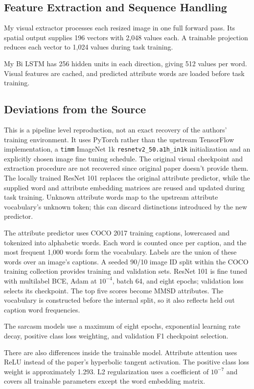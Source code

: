 \documentclass[conference]{IEEEtran}
\begin{document}
\subsection{Feature Extraction and Sequence Handling}
My visual extractor processes each resized image in one full forward pass. Its spatial output supplies 196 vectors with 2,048 values each. A trainable projection reduces each vector to 1,024 values during task training.

My Bi LSTM has 256 hidden units in each direction, giving 512 values per word. Visual features are cached, and predicted attribute words are loaded before task training.

\subsection{Deviations from the Source}
This is a pipeline level reproduction, not an exact recovery of the authors' training environment. It uses PyTorch rather than the upstream TensorFlow implementation, a \texttt{timm} ImageNet 1k \texttt{resnetv2\_50.a1h\_in1k} initialization and an explicitly chosen image fine tuning schedule. The original visual checkpoint and extraction procedure are not recovered since original paper doesn't provide them. The locally trained ResNet 101 replaces the original attribute predictor, while the supplied word and attribute embedding matrices are reused and updated during task training. Unknown attribute words map to the upstream attribute vocabulary's unknown token; this can discard distinctions introduced by the new predictor.

The attribute predictor uses COCO 2017 training captions, lowercased and tokenized into alphabetic words. Each word is counted once per caption, and the most frequent 1,000 words form the vocabulary. Labels are the union of these words over an image's captions. A seeded 90/10 image ID split within the COCO training collection provides training and validation sets. ResNet 101 is fine tuned with multilabel BCE, Adam at $10^{-4}$, batch 64, and eight epochs; validation loss selects its checkpoint. The top five scores become MMSD attributes. The vocabulary is constructed before the internal split, so it also reflects held out caption word frequencies.

The sarcasm models use a maximum of eight epochs, exponential learning rate decay, positive class loss weighting, and validation F1 checkpoint selection.

There are also differences inside the trainable model. Attribute attention uses ReLU instead of the paper's hyperbolic tangent activation. The positive class loss weight is approximately 1.293. L2 regularization uses a coefficient of $10^{-7}$ and covers all trainable parameters except the word embedding matrix.
\end{document}
